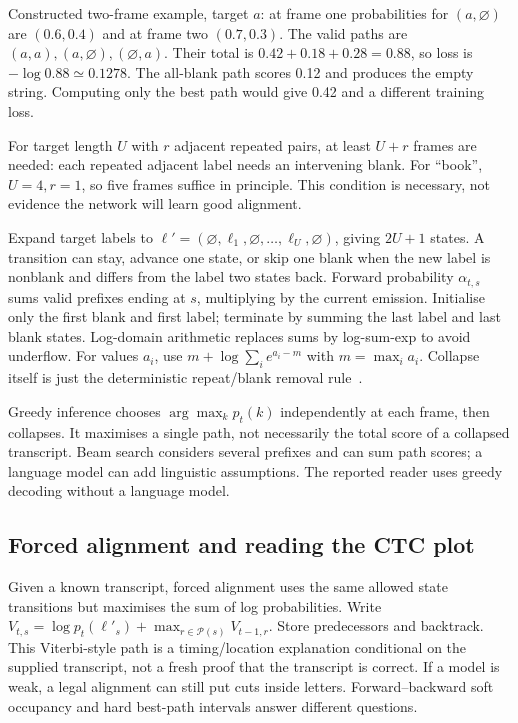 Constructed two-frame example, target $a$: at frame one probabilities for
$(a,\varnothing)$ are $(0.6,0.4)$ and at frame two $(0.7,0.3)$.
The valid paths are $(a,a),(a,\varnothing),(\varnothing,a)$.
Their total is $0.42+0.18+0.28=0.88$, so loss is $-\log0.88\simeq0.1278$.
The all-blank path scores 0.12 and produces the empty string. Computing
only the best path would give 0.42 and a different training loss.

For target length $U$ with $r$ adjacent repeated pairs, at least $U+r$
frames are needed: each repeated adjacent label needs an intervening blank.
For ``book'', $U=4,r=1$, so five frames suffice in principle. This condition
is necessary, not evidence the network will learn good alignment.

Expand target labels to $\ell'=(\varnothing,\ell_1,\varnothing,\ldots,
\ell_U,\varnothing)$, giving $2U+1$ states. A transition can stay, advance
one state, or skip one blank when the new label is nonblank and differs
from the label two states back. Forward probability $\alpha_{t,s}$ sums
valid prefixes ending at $s$, multiplying by the current emission.
Initialise only the first blank and first label; terminate by summing the
last label and last blank states. Log-domain arithmetic replaces sums by
log-sum-exp to avoid underflow. For values $a_i$, use
$m+\log\sum_i e^{a_i-m}$ with $m=\max_i a_i$. Collapse itself is just
the deterministic repeat/blank removal rule~\cite{ctcdistill}.

Greedy inference chooses $\arg\max_k p_t(k)$ independently at each frame,
then collapses. It maximises a single path, not necessarily the total score
of a collapsed transcript. Beam search considers several prefixes and can
sum path scores; a language model can add linguistic assumptions. The
reported reader uses greedy decoding without a language model.

\subsection{Forced alignment and reading the CTC plot}
Given a known transcript, forced alignment uses the same allowed state
transitions but maximises the sum of log probabilities. Write
$V_{t,s}=\log p_t(\ell'_s)+\max_{r\in\mathcal P(s)}V_{t-1,r}$.
Store predecessors and backtrack. This Viterbi-style path is a timing/location
explanation conditional on the supplied transcript, not a fresh proof that
the transcript is correct. If a model is weak, a legal alignment can still
put cuts inside letters. Forward--backward soft occupancy and hard best-path
intervals answer different questions.

